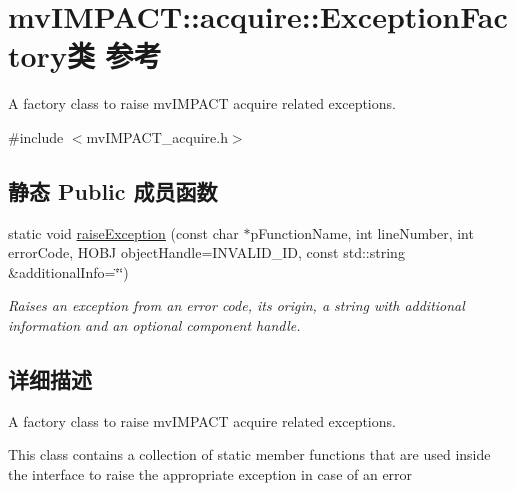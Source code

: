 \hypertarget{classmv_i_m_p_a_c_t_1_1acquire_1_1_exception_factory}{\section{mv\+I\+M\+P\+A\+C\+T\+:\+:acquire\+:\+:Exception\+Factory类 参考}
\label{classmv_i_m_p_a_c_t_1_1acquire_1_1_exception_factory}
}


A factory class to raise mv\+I\+M\+P\+A\+C\+T acquire related exceptions.  




{\ttfamily \#include $<$mv\+I\+M\+P\+A\+C\+T\+\_\+acquire.\+h$>$}

\subsection*{静态 Public 成员函数}
\begin{DoxyCompactItemize}
\item 
static void \hyperlink{classmv_i_m_p_a_c_t_1_1acquire_1_1_exception_factory_a70b2f93291f2269c04ef2092c7872527}{raise\+Exception} (const char $\ast$p\+Function\+Name, int line\+Number, int error\+Code, H\+O\+B\+J object\+Handle=I\+N\+V\+A\+L\+I\+D\+\_\+\+I\+D, const std\+::string \&additional\+Info=\char`\"{}\char`\"{})
\begin{DoxyCompactList}\small\item\em Raises an exception from an error code, its origin, a string with additional information and an optional component handle. \end{DoxyCompactList}\end{DoxyCompactItemize}


\subsection{详细描述}
A factory class to raise mv\+I\+M\+P\+A\+C\+T acquire related exceptions. 

This class contains a collection of static member functions that are used inside the interface to raise the appropriate exception in case of an error 

